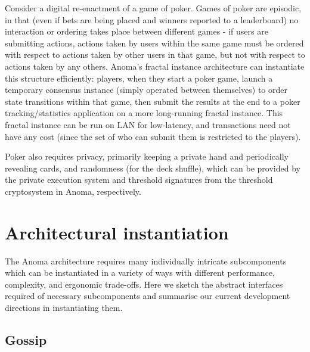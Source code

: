 \documentclass[
    9pt,            %
    commun,        %
    affiltop,       %
]{art}
\begin{document}
Consider a digital re-enactment of a game of poker. Games of poker are
episodic, in that (even if bets are being placed and winners reported to
a leaderboard) no interaction or ordering takes place between different
games - if users are submitting actions, actions taken by users within
the same game must be ordered with respect to actions taken by other
users in that game, but not with respect to actions taken by any others.
Anoma's fractal instance architecture can instantiate
this structure efficiently: players, when they start a poker game,
launch a temporary consensus instance (simply operated between
themselves) to order state transitions within that game, then submit the
results at the end to a poker tracking/statistics application on a more
long-running fractal instance. This fractal instance can be run on LAN
for low-latency, and transactions need not have any cost (since the set
of who can submit them is restricted to the players).

Poker also requires privacy, primarily keeping a private hand and
periodically revealing cards, and randomness (for the deck shuffle),
which can be provided by the private execution system and threshold
signatures from the threshold cryptosystem in Anoma, respectively.

\section{Architectural instantiation}\label{architectural-instantiation}

The Anoma architecture requires many individually intricate
subcomponents which can be instantiated in a variety of ways with
different performance, complexity, and ergonomic trade-offs. Here we
sketch the abstract interfaces required of necessary subcomponents and
summarise our current development directions in instantiating them.

\subsection{Gossip}\label{gossip}
\end{document}
